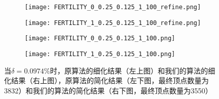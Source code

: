 \begin{figure}[htbp]
  \centering
  \begin{subfigure}[b]{0.4\textwidth}
    \texttt{[image: FERTILITY\_0\_0.25\_0.125\_1\_100\_refine.png]}
  \end{subfigure}
  \begin{subfigure}[b]{0.4\textwidth}
    \texttt{[image: FERTILITY\_1\_0.25\_0.125\_1\_100\_refine.png]}
  \end{subfigure}
  \begin{subfigure}[b]{0.4\textwidth}
    \texttt{[image: FERTILITY\_0\_0.25\_0.125\_1\_100.png]}
  \end{subfigure}
  \begin{subfigure}[b]{0.4\textwidth}
    \texttt{[image: FERTILITY\_1\_0.25\_0.125\_1\_100.png]}
  \end{subfigure}
  \caption[当$\delta=0.0974\%$时fertility结果对比]{当$\delta=0.0974\%$时，原算法的细化结果（左上图）和我们的算法的细化结果（右上图），原算法的简化结果（左下图，最终顶点数量为3832）和我们的算法的简化结果（右下图，最终顶点数量为3550）}
  \label{fig:fertility-res2}
\end{figure}

